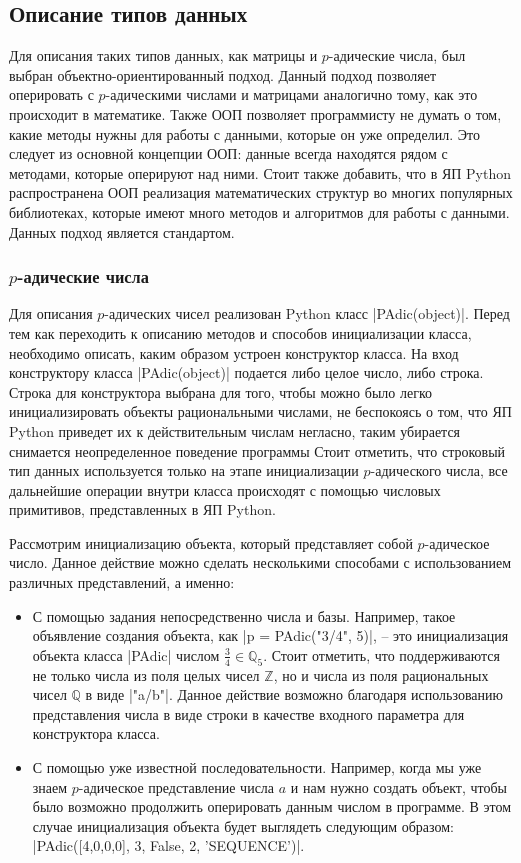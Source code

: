 \documentclass[master, och, diploma, times]{sty/SCWorks}
\theoremstyle{plain}
\theoremstyle{definition}
\numberwithin{equation}{section}
\begin{document}
\subsection{Описание типов данных}

Для описания таких типов данных, как матрицы и $p$-адические числа, был выбран объектно-ориентированный подход. Данный подход позволяет оперировать с $p$-адическими числами и матрицами аналогично тому, как это происходит в математике. Также ООП позволяет программисту не думать о том, какие методы нужны для работы с данными, которые он уже определил. Это следует из основной концепции ООП: данные всегда находятся рядом с методами, которые оперируют над ними. Стоит также добавить, что в ЯП Python распространена ООП реализация математических структур во многих популярных библиотеках, которые имеют много методов и алгоритмов для работы с данными. Данных подход является стандартом.

\subsubsection{$p$-адические числа}

Для описания $p$-адических чисел реализован Python класс |PAdic(object)|. Перед тем как переходить к описанию методов и способов инициализации класса, необходимо описать, каким образом устроен конструктор класса. На вход конструктору класса |PAdic(object)| подается либо целое число, либо строка. Строка для конструктора выбрана для того, чтобы можно было легко инициализировать объекты рациональными числами, не беспокоясь о том, что ЯП Python приведет их к действительным числам негласно, таким убирается снимается неопределенное поведение программы Стоит отметить, что строковый тип данных используется только на этапе инициализации $p$-адического числа, все дальнейшие операции внутри класса происходят с помощью числовых примитивов, представленных в ЯП Python.

Рассмотрим инициализацию объекта, который представляет собой $p$-адическое число. Данное действие можно сделать несколькими способами с использованием различных представлений, а именно:

 \begin{itemize}
 \item С помощью задания непосредственно числа и базы. Например, такое объявление создания объекта, как |p = PAdic("3/4", 5)|, -- это инициализация объекта класса |PAdic| числом \mbox{$\frac{3}{4} \in \mathbb{Q}_5$}. Стоит отметить, что поддерживаются не \mbox{только} числа из поля целых чисел $\mathbb{Z}$, но и числа из поля рациональных чисел $\mathbb{Q}$ в виде |"a/b"|. Данное действие возможно благодаря использованию представления числа в виде строки в качестве входного параметра для конструктора класса.
 \item С помощью уже известной последовательности. Например, когда мы уже знаем $p$-адическое представление числа $a$ и нам нужно создать объект, чтобы было возможно продолжить оперировать данным числом в программе. В этом случае инициализация объекта будет выглядеть следующим образом: |PAdic({[4,0,0,0], 3, False}, 2, 'SEQUENCE')|.
 \end{itemize}
\end{document}
